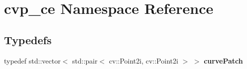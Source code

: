 \hypertarget{namespacecvp__ce}{}\section{cvp\+\_\+ce Namespace Reference}
\label{namespacecvp__ce}
\subsection*{Typedefs}
\begin{DoxyCompactItemize}
\item 
\mbox{\label{namespacecvp__ce_ab01ec866d7352423868c92256099a93e}} 
typedef std\+::vector$<$ std\+::pair$<$ cv\+::\+Point2i, cv\+::\+Point2i $>$ $>$ {\bfseries curve\+Patch}
\end{DoxyCompactItemize}
